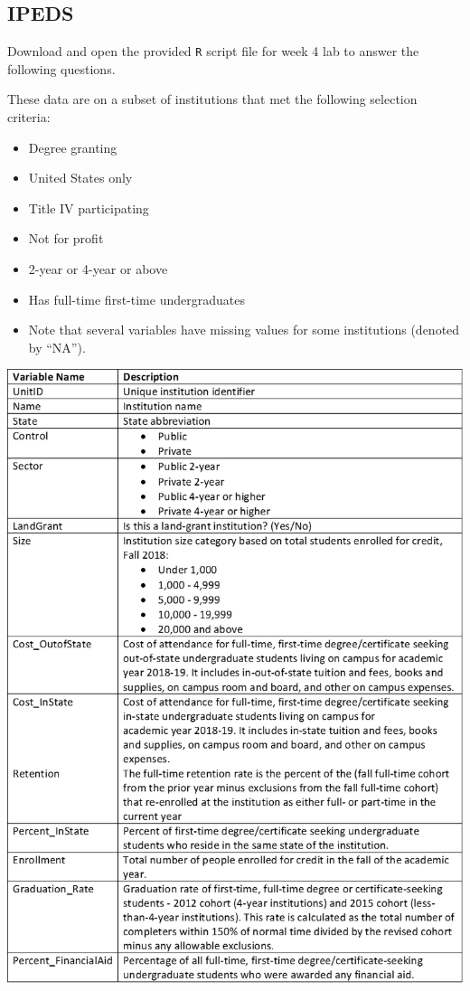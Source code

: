 \documentclass[
]{report}
\begin{document}
\hypertarget{ipeds}{%
\subsection{IPEDS}\label{ipeds}}

Download and open the provided \texttt{R} script file for week 4 lab to answer the following questions.

These data are on a subset of institutions that met the following selection criteria:

\begin{itemize}
\item
  Degree granting
\item
  United States only
\item
  Title IV participating
\item
  Not for profit
\item
  2-year or 4-year or above
\item
  Has full-time first-time undergraduates
\item
  Note that several variables have missing values for some institutions (denoted by ``NA'').
\end{itemize}

\begin{center}\includegraphics[width=0.75\linewidth]{images/IPEDS_Description} \end{center}
\end{document}

